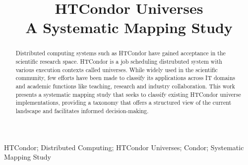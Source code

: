 \documentclass[]{interact}
\theoremstyle{plain}%
\theoremstyle{definition}
\theoremstyle{remark}
\begin{document}

\title{
	HTCondor Universes\\
	A Systematic Mapping Study
}


\author{
}

\maketitle

\begin{abstract}
	Distributed computing systems such as HTCondor have gained acceptance in the scientific research space. HTCondor is a job scheduling distrubuted system with various execution contexts called universes. While widely used in the scientific community, few efforts have been made to classify its applications across IT domains and academic functions like teaching, research and industry collaboration. This work presents a systematic mapping study that seeks to classify existing HTCondor universe implementations, providing a taxonomy that offers a structured view of the current landscape and facilitates informed decision-making.
\end{abstract}

\begin{keywords}
	HTCondor; Distributed Computing; HTCondor Universes; Condor; Systematic Mapping Study
\end{keywords}




























\end{document}
